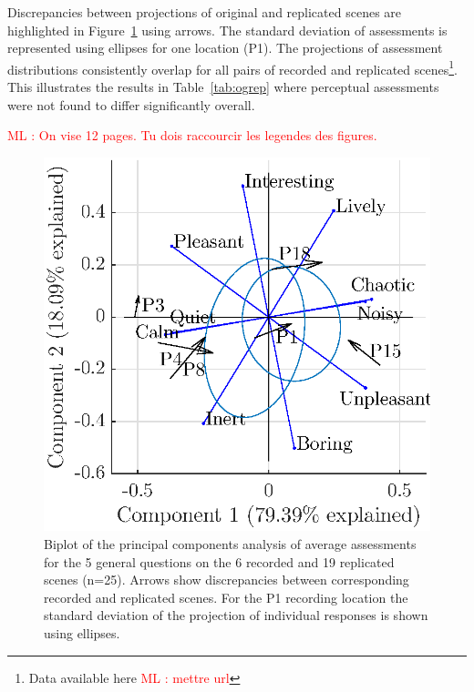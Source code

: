 \documentclass[twocolumn]{article}
\newcommand{\ml}[1]{\textcolor{red}{ML : #1}}
\begin{document}
Discrepancies between projections of original and replicated scenes are highlighted in Figure~\ref{fig:pspace_rec} using arrows. The standard deviation of assessments is represented using ellipses for one location (P1). The projections of assessment distributions consistently overlap for all pairs of recorded and replicated scenes\footnote{Data available here \url{} \ml{mettre url}}. This illustrates the results in Table~\ref{tab:ogrep} where perceptual assessments were not found to differ significantly overall.

\ml{On vise 12 pages. Tu dois raccourcir les legendes des figures.}

\begin{figure}[th]
    \centering
    \includegraphics[width=0.8\columnwidth]{figures/pca_p1.eps}
    \caption{Biplot of the principal components analysis of average assessments for the 5 general questions on the 6 recorded and 19 replicated scenes (n=25). Arrows show discrepancies between corresponding recorded and replicated scenes. For the P1 recording location the standard deviation of the projection of individual responses is shown using ellipses.}\label{fig:pspace_rec}
\end{figure}
\end{document}

